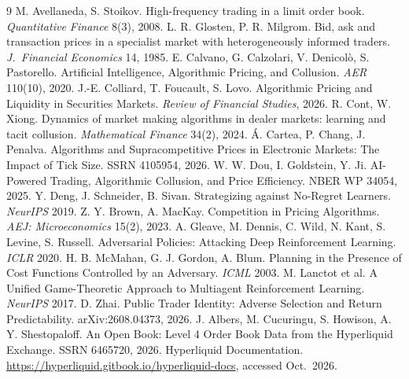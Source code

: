 \documentclass[10pt]{article}
\begin{document}
\begin{thebibliography}{9}\footnotesize\setlength{\itemsep}{0pt}
 M. Avellaneda, S. Stoikov. High-frequency trading in a limit order book. \emph{Quantitative Finance} 8(3), 2008.
 L. R. Glosten, P. R. Milgrom. Bid, ask and transaction prices in a specialist market with heterogeneously informed traders. \emph{J.\ Financial Economics} 14, 1985.
 E. Calvano, G. Calzolari, V. Denicol\`o, S. Pastorello. Artificial Intelligence, Algorithmic Pricing, and Collusion. \emph{AER} 110(10), 2020.
 J.-E. Colliard, T. Foucault, S. Lovo. Algorithmic Pricing and Liquidity in Securities Markets. \emph{Review of Financial Studies}, 2026.
 R. Cont, W. Xiong. Dynamics of market making algorithms in dealer markets: learning and tacit collusion. \emph{Mathematical Finance} 34(2), 2024.
 \'A. Cartea, P. Chang, J. Penalva. Algorithms and Supracompetitive Prices in Electronic Markets: The Impact of Tick Size. SSRN 4105954, 2026.
 W. W. Dou, I. Goldstein, Y. Ji. AI-Powered Trading, Algorithmic Collusion, and Price Efficiency. NBER WP 34054, 2025.
 Y. Deng, J. Schneider, B. Sivan. Strategizing against No-Regret Learners. \emph{NeurIPS} 2019.
 Z. Y. Brown, A. MacKay. Competition in Pricing Algorithms. \emph{AEJ: Microeconomics} 15(2), 2023.
 A. Gleave, M. Dennis, C. Wild, N. Kant, S. Levine, S. Russell. Adversarial Policies: Attacking Deep Reinforcement Learning. \emph{ICLR} 2020.
 H. B. McMahan, G. J. Gordon, A. Blum. Planning in the Presence of Cost Functions Controlled by an Adversary. \emph{ICML} 2003.
 M. Lanctot et al. A Unified Game-Theoretic Approach to Multiagent Reinforcement Learning. \emph{NeurIPS} 2017.
 D. Zhai. Public Trader Identity: Adverse Selection and Return Predictability. arXiv:2608.04373, 2026.
 J. Albers, M. Cucuringu, S. Howison, A. Y. Shestopaloff. An Open Book: Level 4 Order Book Data from the Hyperliquid Exchange. SSRN 6465720, 2026.
 Hyperliquid Documentation. \url{https://hyperliquid.gitbook.io/hyperliquid-docs}, accessed Oct.\ 2026.
\end{thebibliography}
\end{document}
